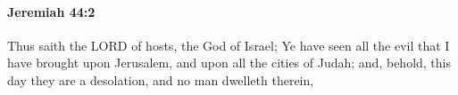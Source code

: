 
		\paragraph{Jeremiah 44:2} %
			\label{JEREMIAH-44-2}

			Thus saith the LORD of hosts, the God of Israel; Ye have seen all the evil that I have brought upon Jerusalem, and upon all the cities of Judah; and, behold, this day they are a desolation, and no man dwelleth therein,


